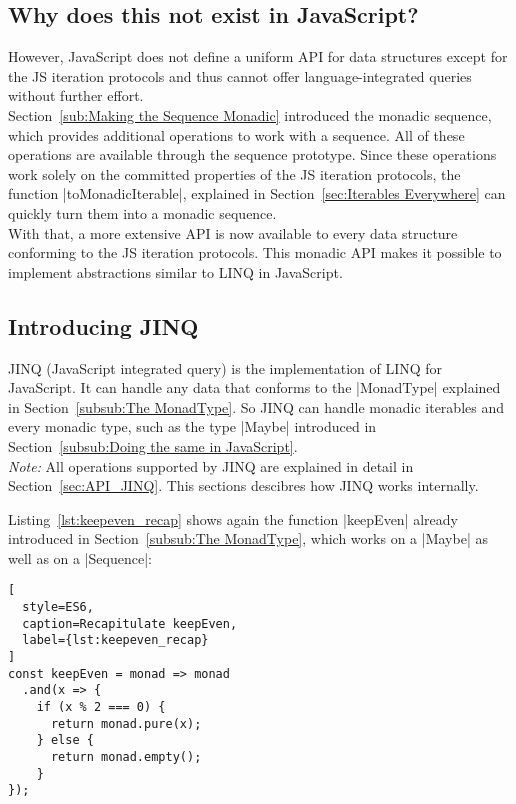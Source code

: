 \subsection{Why does this not exist in JavaScript?} %
\label{sub:Why does this not exist in JavaScript?}
However, JavaScript does not define a uniform API for data structures except
for the JS iteration protocols and thus cannot offer language-integrated queries
without further effort. \\
Section~\ref{sub:Making the Sequence Monadic} introduced the monadic sequence,
which provides additional operations to work with a sequence. All of these
operations are available through the sequence prototype. Since these
operations work solely on the committed properties of the JS iteration
protocols, the function |toMonadicIterable|, explained in
Section~\ref{sec:Iterables Everywhere} can quickly turn them into a monadic
sequence.\\
With that, a more extensive API is now available to every data structure
conforming to the JS iteration protocols. This monadic API makes it possible to
implement abstractions similar to LINQ in JavaScript.

\subsection{Introducing JINQ} %
\label{sub:Introducing JINQ}
JINQ (JavaScript integrated query) is the implementation of LINQ for
JavaScript. It can handle any data that conforms to the |MonadType| explained
in Section~\ref{subsub:The MonadType}. So JINQ can handle monadic iterables and
every monadic type, such as the type |Maybe| introduced in
Section~\ref{subsub:Doing the same in JavaScript}.\\
\textit{Note:} All operations supported by JINQ are explained in detail in 
Section~\ref{sec:API_JINQ}. This sections descibres how JINQ works
internally.

Listing~\ref{lst:keepeven_recap} shows again the function |keepEven| already
introduced in Section~\ref{subsub:The MonadType}, which works on a |Maybe| as
well as on a |Sequence|:
\begin{lstlisting}[
  style=ES6,
  caption=Recapitulate keepEven,
  label={lst:keepeven_recap}
]
const keepEven = monad => monad
  .and(x => {
    if (x % 2 === 0) {
      return monad.pure(x);
    } else {
      return monad.empty();
    }
}); 
\end{lstlisting}

